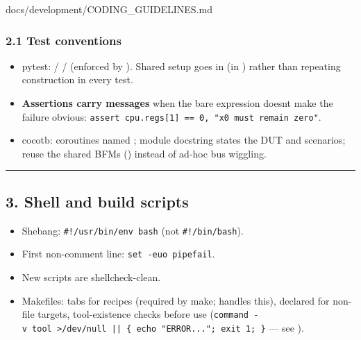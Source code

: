 \begin{relocated}{docs/development/CODING_GUIDELINES.md}
\subsubsection{2.1 Test conventions}\label{um:guide:coding-guidelines:21-test-conventions}

\begin{itemize}
\tightlist
\item
  pytest:  /  /  (enforced by
  ). Shared setup goes in
   (in ) rather than repeating
  construction in every test.
\item
  \textbf{Assertions carry messages} when the bare expression
  doesn\textquotesingle t make the failure obvious:
  \texttt{assert\ cpu.\allowbreak{}regs[1]\ =\allowbreak{}=\allowbreak{}\ 0,\allowbreak{}\ "x0\ must\ remain\ zero"}.
\item
  cocotb:  coroutines named ;
  module docstring states the DUT and scenarios; reuse the shared BFMs
  () instead of ad-hoc bus wiggling.
\end{itemize}

\begin{center}\rule{0.5\linewidth}{0.5pt}\end{center}

\subsection{3. Shell and build scripts}\label{um:guide:coding-guidelines:3-shell-and-build-scripts}

\begin{itemize}
\tightlist
\item
  Shebang:
  \texttt{\#!/\allowbreak{}usr/\allowbreak{}bin/\allowbreak{}env\ bash}
  (not \texttt{\#!/\allowbreak{}bin/\allowbreak{}bash}).
\item
  First non-comment line: \texttt{set\ -\allowbreak{}euo\ pipefail}.
\item
  New scripts are shellcheck-clean.
\item
  Makefiles: tabs for recipes (required by make; 
  handles this),  declared for non-file targets,
  tool-existence checks before use
  (\texttt{command\ -\allowbreak{}v\ tool\ >/\allowbreak{}dev/\allowbreak{}null\ ||\ \{\ echo\ "ERROR.\allowbreak{}.\allowbreak{}.\allowbreak{}";\ exit\ 1;\ \}}
  --- see ).
\end{itemize}


\end{relocated}
